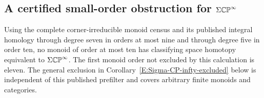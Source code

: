 \subsection{A certified small-order obstruction for $\Sigma\mathbb {CP}^\infty$}
\label{E:sigma-small-section}

\begin{proposition}
\label{E:sigma-small}
Using the complete corner-irreducible monoid census and its published
integral homology through degree seven in orders at most nine and
through degree five in order ten, no monoid of order at most ten
has classifying space homotopy equivalent to $\Sigma\mathbb {CP}^\infty$.
The first monoid order not excluded by this calculation is eleven.
The general exclusion in Corollary~\ref{E:Sigma-CP-infty-excluded}
below is independent of this published prefilter and covers arbitrary
finite monoids and categories.
\end{proposition}

